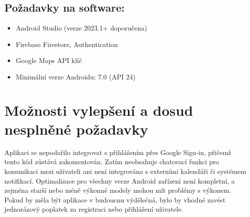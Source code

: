 \subsection*{Požadavky na software:}
\begin{itemize}
\item Android Studio (verze 2023.1+ doporučena)
\item Firebase Firestore, Authentication
\item Google Maps API klíč
\item Minimální verze Androidu: 7.0 (API 24)
\end{itemize}

\section{Možnosti vylepšení a dosud nesplněné požadavky}
Aplikaci se nepodařilo integrovat s přihlášením přes Google Sign-in, přičemž tento kód zůstává zakomentován. Zatím neobsahuje chatovací funkci pro komunikaci mezi uživateli ani není integrována s externími kalendáři či systémem notifikací. Optimalizace pro všechny verze Android zařízení není kompletní, a zejména starší nebo méně výkonné modely mohou mít problémy s výkonem. Pokud by měla být aplikace v budoucnu výdělečná, bylo by vhodné zavést jednorázový poplatek za registraci nebo přihlášení uživatele.
